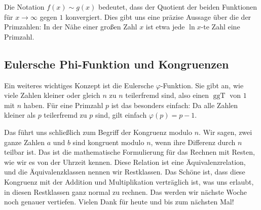 \begin{math-stroke}

\begin{explanation-of-steps}
Die Notation $f(x) \sim g(x)$ bedeutet, dass der Quotient der beiden Funktionen für $x \to \infty$ gegen $1$ konvergiert. Dies gibt uns eine präzise Aussage über die  der Primzahlen: In der Nähe einer großen Zahl $x$ ist etwa jede $\ln x$-te Zahl eine Primzahl.
\end{explanation-of-steps}
\end{math-stroke}

\subsection{Eulersche Phi-Funktion und Kongruenzen}

\begin{spoken-clean}[01:11:00 - 01:21:44]
Ein weiteres wichtiges Konzept ist die Eulersche $\varphi$-Funktion. Sie gibt an, wie viele Zahlen kleiner oder gleich $n$ zu $n$ teilerfremd sind, also einen $\operatorname{ggT}$ von $1$ mit $n$ haben. Für eine Primzahl $p$ ist das besonders einfach: Da alle Zahlen kleiner als $p$ teilerfremd zu $p$ sind, gilt einfach $\varphi(p) = p - 1$.

Das führt uns schließlich zum Begriff der Kongruenz modulo $n$. Wir sagen, zwei ganze Zahlen $a$ und $b$ sind kongruent modulo $n$, wenn ihre Differenz durch $n$ teilbar ist. Das ist die mathematische Formulierung für das Rechnen mit Resten, wie wir es von der Uhrzeit kennen. Diese Relation ist eine Äquivalenzrelation, und die Äquivalenzklassen nennen wir Restklassen. Das Schöne ist, dass diese Kongruenz mit der Addition und Multiplikation verträglich ist, was uns erlaubt, in diesen Restklassen ganz normal zu rechnen. Das werden wir nächste Woche noch genauer vertiefen. Vielen Dank für heute und bis zum nächsten Mal!
\end{spoken-clean}

